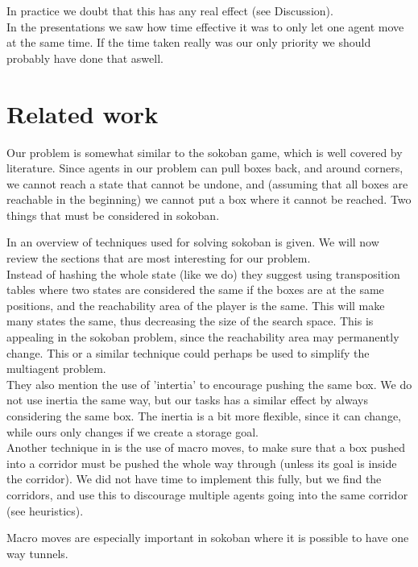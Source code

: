 \documentclass[letterpaper]{article}
\begin{document}
In practice we doubt that this has any real effect (see Discussion).\\

In the presentations we saw how time effective it was to only let one agent move at
the same time. If the time taken really was our only priority we should probably
have done that aswell.

\section{Related work}
Our problem is somewhat similar to the sokoban game, which is well covered by
literature. Since agents in our problem can pull boxes back, and around corners,
we cannot reach a state that cannot be undone, and (assuming that all boxes are
reachable in the beginning) we cannot put a box where it cannot be reached. Two
things that must be considered in sokoban.

In \cite{sokobanMA} an overview of techniques used for solving sokoban is given.
We will now review the sections that are most interesting for our problem.\\

Instead of hashing the whole state (like we do) they suggest using transposition
tables where two states are considered the same if the boxes are at the same positions,
and the reachability area of the player is the same. This will make many states
the same, thus decreasing the size of the search space. This is appealing in
the sokoban problem, since the reachability area may permanently change. This
or a similar technique could perhaps be used to simplify the multiagent problem.\\

They also mention the use of 'intertia' to encourage pushing the same box.
We do not use inertia the same way, but our tasks has a similar effect by
always considering the same box. The inertia is a bit more flexible, since
it can change, while ours only changes if we create a storage goal.\\

Another technique in \cite{sokobanMA} is the use of macro moves, to make
sure that a box pushed into a corridor must be pushed the whole way through
(unless its goal is inside the corridor). We did not have time to implement
this fully, but we find the corridors, and use this to discourage multiple agents
going into the same corridor (see heuristics).

Macro moves are especially important in sokoban where it is possible to have
one way tunnels.\\
\end{document}
